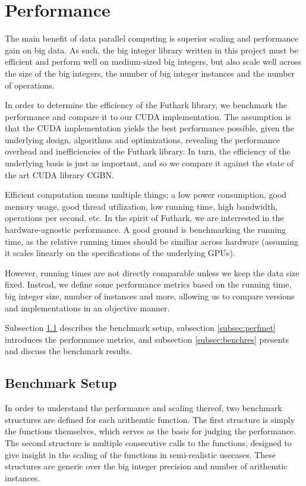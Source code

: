 \section{Performance}
\label{sec:per}

The main benefit of data parallel computing is superior scaling and performance gain on big data. As such, the big integer library written in this project must be efficient and perform well on medium-sized big integers, but also scale well across the size of the big integers, the number of big integer instances and the number of operations.

In order to determine the efficiency of the Futhark library, we benchmark the performance and compare it to our CUDA implementation. The assumption is that the CUDA implementation yields the best performance possible, given the underlying design, algorithms and optimizations, revealing the performance overhead and inefficiencies of the Futhark library. In turn, the efficiency of the underlying basis is just as important, and so we compare it against the state of the art CUDA library CGBN.

Efficient computation means multiple things; a low power consumption, good memory usage, good thread utilization, low running time, high bandwidth, operations per second, etc. In the spirit of Futhark, we are interrested in the hardware-agnostic performance. A good ground is benchmarking the running time, as the relative running times should be similiar across hardware (assuming it scales linearly on the specifications of the underlying GPUs).

However, running times are not directly comparable unless we keep the data size fixed. Instead, we define some performance metrics based on the running time, big integer size, number of instances and more, allowing us to compare versions and implementations in an objective manner.

Subsection \ref{subsec:benchset} describes the benchmark setup, subsection \ref{subsec:perfmet} introduces the performance metrics, and subsection \ref{subsec:benchres} presents and discuss the benchmark results.

\subsection{Benchmark Setup}
\label{subsec:benchset}

In order to understand the performance and scaling thereof, two benchmark structures are defined for each arithemtic function. The first structure is simply the functions themselves, which serves as the basis for judging the performance. The second structure is multiple consecutive calls to the functions, designed to give insight in the scaling of the functions in semi-realistic usecases. These structures are generic over the big integer precision and number of arithemtic instances.

